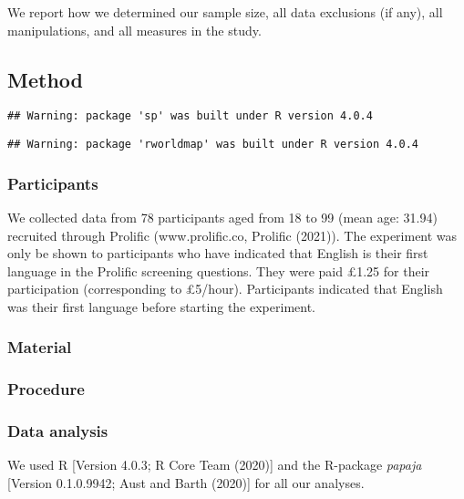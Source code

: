 \documentclass[
  english,
  man]{apa6}
\begin{document}
We report how we determined our sample size, all data exclusions (if any), all manipulations, and all measures in the study.

\hypertarget{method}{%
\subsection{Method}\label{method}}

\begin{verbatim}
## Warning: package 'sp' was built under R version 4.0.4
\end{verbatim}

\begin{verbatim}
## Warning: package 'rworldmap' was built under R version 4.0.4
\end{verbatim}

\hypertarget{participants}{%
\subsubsection{Participants}\label{participants}}

We collected data from 78 participants aged from 18 to 99 (mean age: 31.94) recruited through Prolific (www.prolific.co, Prolific (2021)). The experiment was only be shown to participants who have indicated that English is their first language in the Prolific screening questions. They were paid £1.25 for their participation (corresponding to £5/hour). Participants indicated that English was their first language before starting the experiment.

\hypertarget{material}{%
\subsubsection{Material}\label{material}}

\hypertarget{procedure}{%
\subsubsection{Procedure}\label{procedure}}

\hypertarget{data-analysis}{%
\subsubsection{Data analysis}\label{data-analysis}}

We used R {[}Version 4.0.3; R Core Team (2020){]} and the R-package \emph{papaja} {[}Version 0.1.0.9942; Aust and Barth (2020){]} for all our analyses.
\end{document}
